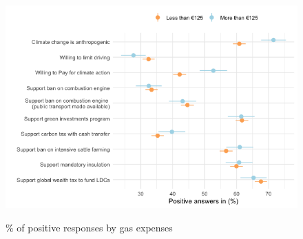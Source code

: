 \begin{framefont}{\small}
\begin{frame}{}%
\begin{figure}[h!]
\caption{\% of positive responses by gas expenses}
\includegraphics[width=.7\paperwidth]{../figures/FR/positive_all_by_gas_expenses_FR.png} \\
\end{figure}
\end{frame}




\end{framefont}
